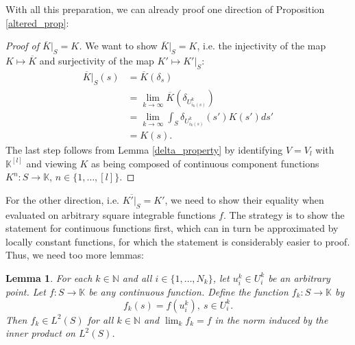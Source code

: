 \documentclass[12pt, a4paper]{article}
\theoremstyle{plain}
\newtheorem{lem}[pro]{Lemma}
\theoremstyle{definition}
\theoremstyle{remark}
\newcommand{\N}{\mathds{N}}
\newcommand{\K}{\mathds{K}}
\newcommand{\uu}{U_{i_k(s)}^k}
\begin{document}
With all this preparation, we can already proof one direction of Proposition \ref{altered_prop}:

\begin{proof}[Proof of $\overline{K}|_S = K$]
We want to show $\overline{K}|_S = K$, i.e. the injectivity of the map $K \mapsto \overline{K}$ and surjectivity of the map $K' \mapsto K'|_S$:
\begin{align*}
\overline{K}|_S(s) & = \overline{K}(\delta_s) \\
& = \lim_{k \to \infty} \overline{K}\left( \delta_{\uu}\right) \\
& = \lim_{k \to \infty} \int_{S} \delta_{\uu} (s') K(s') ds' \\
& = K(s).
\end{align*}
The last step follows from Lemma \ref{delta_property} by identifying $V = V_l$ with $\K^{[l]}$ and viewing $K$ as being composed of continuous component functions $K^n: S \to \K$, $n \in \{1, \dots, [l]\}$.
\end{proof}

For the other direction, i.e. $\overline{K'|_S} = K'$, we need to show their equality when evaluated on arbitrary square integrable functions $f$. The strategy is to show the statement for continuous functions first, which can in turn be approximated by locally constant functions, for which the statement is considerably easier to proof. Thus, we need too more lemmas:

\begin{lem}\label{approximate_step}
For each $k \in \N$ and all $i \in \{1, \dots, N_k\}$, let $u_i^k \in U_i^k$ be an arbitrary point. Let $f: S \to \K$ be any continuous function. Define the function $f_k: S \to \K$ by
\begin{equation*}
f_k(s) = f(u_i^k), \ s \in U_i^k.
\end{equation*}
Then $f_k \in L^2(S)$ for all $k \in \N$ and $\lim_{k} f_k = f$ in the norm induced by the inner product on $L^2(S)$.
\end{lem}
\end{document}
